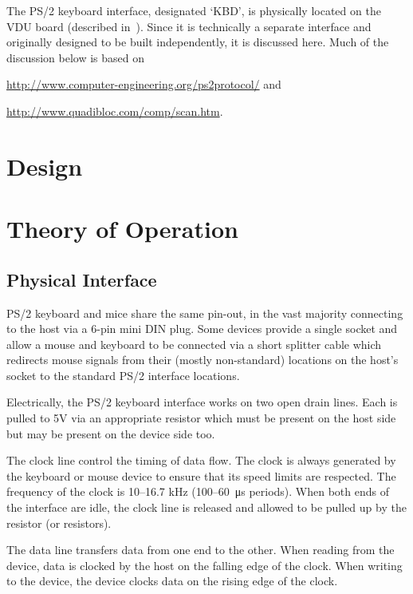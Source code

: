 \label{chap:kbd}

The PS/2 keyboard interface, designated ‘KBD’, is physically located
on the VDU board (described in~). Since it is
technically a separate interface and originally designed to be built
independently, it is discussed here. Much of the discussion below is based on
\begin{center}
\url{http://www.computer-engineering.org/ps2protocol/} and

\url{http://www.quadibloc.com/comp/scan.htm}.
\end{center}

\section{Design}

\section{Theory of Operation}

\subsection{Physical Interface}

PS/2 keyboard and mice share the same pin-out, in the vast majority connecting
to the host via a 6-pin mini DIN plug. Some devices provide a single socket and
allow a mouse and keyboard to be connected via a short splitter cable which
redirects mouse signals from their (mostly non-standard) locations on the
host's socket to the standard PS/2 interface locations.

Electrically, the PS/2 keyboard interface works on two open drain lines. Each
is pulled to 5V via an appropriate resistor which must be present on the host
side but may be present on the device side too.

The clock line control the timing of data flow. The clock is always generated
by the keyboard or mouse device to ensure that its speed limits are
respected. The frequency of the clock is 10–16.7 kHz (100–60~μs periods). When
both ends of the interface are idle, the clock line is released and allowed to
be pulled up by the resistor (or resistors).

The data line transfers data from one end to the other. When reading from the
device, data is clocked by the host on the falling edge of the clock. When
writing to the device, the device clocks data on the rising edge of the clock.

